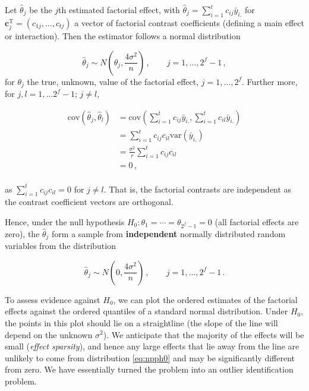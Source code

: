 \documentclass[
]{book}
\theoremstyle{definition}
\theoremstyle{definition}
\theoremstyle{definition}
\theoremstyle{definition}
\theoremstyle{remark}
\begin{document}
Let \(\hat{\theta}_j\) be the \(j\)th estimated factorial effect, with \(\hat{\theta}_j = \sum_{i=1}^tc_{ij}\bar{y}_{i.}\) for \(\boldsymbol{c}_j^{\mathrm{T}} = (c_{1j}, \ldots, c_{tj})\) a vector of factorial contrast coefficients (defining a main effect or interaction). Then the estimator follows a normal distribution

\[
\hat{\theta}_j \sim N\left(\theta_j, \frac{4\sigma^2}{n}\right)\,,\qquad j = 1, \ldots, 2^f-1\,,
\]
for \(\theta_j\) the true, unknown, value of the factorial effect, \(j = 1,\ldots, 2^f\). Further more, for \(j, l = 1, \ldots 2^f-1; \, j\ne l\),

\begin{align*}
\mbox{cov}(\hat{\theta}_j, \hat{\theta}_l) & =  \mbox{cov}\left(\sum_{i=1}^tc_{ij}\bar{y}_{i.}, \sum_{i=1}^tc_{il}\bar{y}_{i.}\right) \\
& = \sum_{i=1}^tc_{ij}c_{il}\mbox{var}(\bar{y}_{i.}) \\
& = \frac{\sigma^2}{r} \sum_{i=1}^tc_{ij}c_{il} \\
& = 0\,, \\
\end{align*}

as \(\sum_{i=1}^tc_{ij}c_{il} = 0\) for \(j\ne l\). That is, the factorial contrasts are independent as the contrast coefficient vectors are orthogonal.

Hence, under the null hypothesis \(H_0: \theta_1 = \cdots = \theta_{2^f-1} = 0\) (all factorial effects are zero), the \(\hat{\theta}_j\) form a sample from \textbf{independent} normally distributed random variables from the distribution

\begin{equation}
\hat{\theta}_j \sim N\left(0, \frac{4\sigma^2}{n}\right)\,,\qquad j = 1, \ldots, 2^f-1\,.
\label{eq:npph0}
\end{equation}

To assess evidence against \(H_0\), we can plot the ordered estimates of the factorial effects against the ordered quantiles of a standard normal distribution. Under \(H_0\), the points in this plot should lie on a straightline (the slope of the line will depend on the unknown \(\sigma^2\)). We anticipate that the majority of the effects will be small (\emph{effect sparsity}), and hence any large effects that lie away from the line are unlikely to come from distribution \eqref{eq:npph0} and may be significantly different from zero. We have essentially turned the problem into an outlier identification problem.
\end{document}

